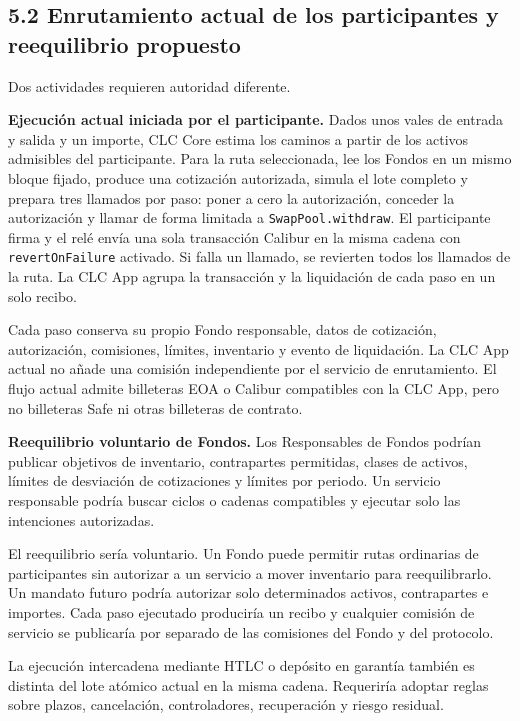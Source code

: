 \documentclass[11pt]{article}
\begin{document}
\subsection*{5.2 Enrutamiento actual de los participantes y reequilibrio propuesto}

Dos actividades requieren autoridad diferente.

\textbf{Ejecución actual iniciada por el participante.} Dados unos vales de entrada y salida y un importe, CLC Core estima los caminos a partir de los activos admisibles del participante. Para la ruta seleccionada, lee los Fondos en un mismo bloque fijado, produce una cotización autorizada, simula el lote completo y prepara tres llamados por paso: poner a cero la autorización, conceder la autorización y llamar de forma limitada a \texttt{SwapPool.withdraw}. El participante firma y el relé envía una sola transacción Calibur en la misma cadena con \texttt{revertOnFailure} activado. Si falla un llamado, se revierten todos los llamados de la ruta. La CLC App agrupa la transacción y la liquidación de cada paso en un solo recibo.

Cada paso conserva su propio Fondo responsable, datos de cotización, autorización, comisiones, límites, inventario y evento de liquidación. La CLC App actual no añade una comisión independiente por el servicio de enrutamiento. El flujo actual admite billeteras EOA o Calibur compatibles con la CLC App, pero no billeteras Safe ni otras billeteras de contrato.

\textbf{Reequilibrio voluntario de Fondos.} Los Responsables de Fondos podrían publicar objetivos de inventario, contrapartes permitidas, clases de activos, límites de desviación de cotizaciones y límites por periodo. Un servicio responsable podría buscar ciclos o cadenas compatibles y ejecutar solo las intenciones autorizadas.

El reequilibrio sería voluntario. Un Fondo puede permitir rutas ordinarias de participantes sin autorizar a un servicio a mover inventario para reequilibrarlo. Un mandato futuro podría autorizar solo determinados activos, contrapartes e importes. Cada paso ejecutado produciría un recibo y cualquier comisión de servicio se publicaría por separado de las comisiones del Fondo y del protocolo.

La ejecución intercadena mediante HTLC o depósito en garantía también es distinta del lote atómico actual en la misma cadena. Requeriría adoptar reglas sobre plazos, cancelación, controladores, recuperación y riesgo residual.
\end{document}
